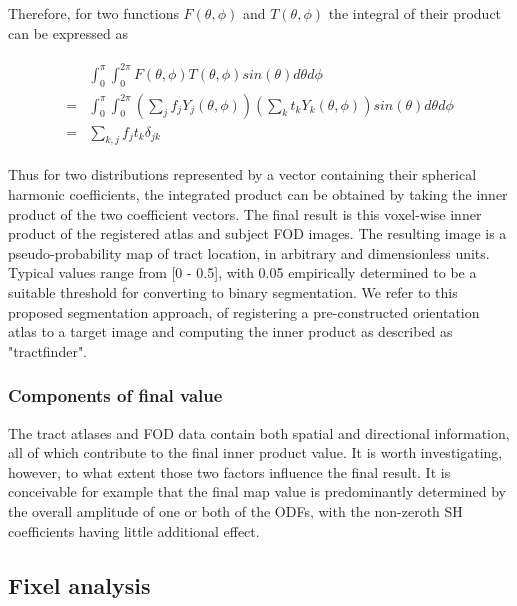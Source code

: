 Therefore, for two functions  $F(\theta, \phi)$ and $T(\theta, \phi)$ the integral of their product can be expressed as

\begin{align}
  \begin{split}
    & \int_0^{\pi} \int_0^{2\pi} F(\theta, \phi) T(\theta, \phi) sin(\theta) d\theta d\phi \\
    = & \int_0^{\pi} \int_0^{2\pi} (\sum_j f_jY_j(\theta, \phi)) (\sum_k t_kY_k(\theta, \phi)) sin(\theta) d\theta d\phi \\
    = & \sum_{k,j} f_j t_k \delta_{jk}
  \end{split}
\end{align}


Thus for two distributions represented by a vector containing their spherical harmonic coefficients, the integrated product can be obtained by taking the inner product of the two coefficient vectors.
The final result is this voxel-wise inner product of the registered atlas and subject FOD images. The resulting image is a pseudo-probability map of tract location, in arbitrary and dimensionless units. Typical values range from [0 - 0.5], with 0.05 empirically determined to be a suitable threshold for converting to binary segmentation.
We refer to this proposed segmentation approach, of registering a pre-constructed orientation atlas to a target image and computing the inner product as described as "tractfinder".


\subsubsection{Components of final value}

The tract atlases and FOD data contain both spatial and directional information, all of which contribute to the final inner product value.
It is worth investigating, however, to what extent those two factors influence the final result.
It is conceivable for example that the final map value is predominantly determined by the overall amplitude of one or both of the ODFs, with the non-zeroth SH coefficients having little additional effect.


\subsection{Fixel analysis}
